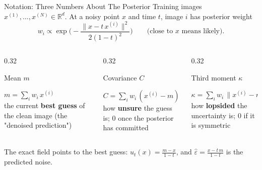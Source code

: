 \documentclass[aspectratio=169]{beamer}
\newcommand{\hl}[1]{\textcolor{coolpurple}{\textbf{#1}}}
\newcommand{\R}{\mathbb{R}}
\newcommand{\xn}[1]{x^{(#1)}}
\newcommand{\eps}{\hat\varepsilon}
\begin{document}
	\begin{frame}{Notation: Three Numbers About The Posterior}
		\small
		Training images $\xn{1}, \dots, \xn{N} \in \R^d$. At a noisy point $x$ and time $t$, image $i$ has posterior weight
		$$
			w_i \propto \exp\!\Big(-\frac{\|x - t\,\xn{i}\|^2}{2(1 - t)^2}\Big) \qquad \text{(close to $x$ means likely)}.
		$$
		\vspace{-0.6em}
		\begin{columns}[onlytextwidth, T]
			\begin{column}{0.32\textwidth}
				\begin{block}{Mean $m$}
					\footnotesize
					\begin{minipage}[t][1.9cm][t]{\linewidth}
						$m = \sum_i w_i\,\xn{i}$\\[0.3em]
						the current \hl{best guess} of the clean image (the "denoised prediction")
					\end{minipage}
				\end{block}
			\end{column}
			\begin{column}{0.32\textwidth}
				\begin{block}{Covariance $C$}
					\footnotesize
					\begin{minipage}[t][1.9cm][t]{\linewidth}
						$C = \sum_i w_i\,(\xn{i} - m)(\cdot)^\top$\\[0.3em]
						how \hl{unsure} the guess is; $0$ once the posterior has committed
					\end{minipage}
				\end{block}
			\end{column}
			\begin{column}{0.32\textwidth}
				\begin{block}{Third moment $\kappa$}
					\footnotesize
					\begin{minipage}[t][1.9cm][t]{\linewidth}
						$\kappa = \sum_i w_i\,\|\xn{i} - m\|^2(\cdot)$\\[0.3em]
						how \hl{lopsided} the uncertainty is; $0$ if it is symmetric
					\end{minipage}
				\end{block}
			\end{column}
		\end{columns}
		\vspace{0.3em}
		The exact field points to the best guess: $u_t(x) = \frac{m - x}{1 - t}$, and $\eps = \frac{x - t\,m}{1 - t}$ is the predicted noise.
	\end{frame}
\end{document}
